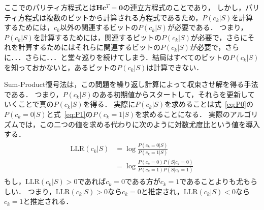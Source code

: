 \documentclass[twocolumn, a4paper]{ieicejsp}
\newcommand{\brkts}[1]{\left(#1\right)}
\begin{document}
ここでのパリティ方程式とは$\mathbf{H}\mathbf{c}^T=\mathbf{0}$の連立方程式のことであり，
しかし，パリティ方程式は複数のビットから計算される方程式であるため，$P(c_k|S)$を計算するためには，$c_k$以外の関連するビットの$P(c_k|S)$が必要である．
つまり，$P(c_k|S)$を計算するためには，関連するビットの$P(c_k|S)$が必要で，さらにそれを計算するためにはそれらに関連するビットの$P(c_k|S)$が必要で，さらに．．．さらに．．．と堂々巡りを続けてしまう．結局はすべてのビットの$P(c_k|S)$を知っておかないと，あるビットの$P(c_k|S)$は計算できない．



Sum-Product復号法は，この問題を繰り返し計算によって収束させ解を得る手法である．
つまり，$P(c_k|S)$のある初期値からスタートして，それらを更新していくことで真の$P(c_k|S)$を得る．
実際に$P(c_k|S)$を求めることは式~\eqref{eq:P0}の$P(c_k=0 | S)$と式~\eqref{eq:P1}の$P(c_k=1 | S)$を求めることになる．
実際のアルゴリズムでは，この二つの値を求める代わりに次のように対数尤度比という値を導入する．
\begin{align}
  \begin{split}
    \mathrm{LLR}(c_k|S) &= \log \frac{ P(c_k=0|S) }{ P(c_k=1|S) } \\
    &= \log \frac{P(c_k=0) P(S|c_k=0)}{P(c_k=1) P(S|c_k=1)}
  \end{split} \label{eq:def:LLR_c_k_S}
\end{align}
もし，$\mathrm{LLR}(c_k|S) > 0$であれば$c_k = 0$である方が$c_k = 1$であることよりも尤もらしい．
つまり，$\mathrm{LLR}(c_k|S) > 0$なら$c_k = 0$と推定され，$\mathrm{LLR}(c_k|S) < 0$なら$c_k = 1$と推定される．
\end{document}
